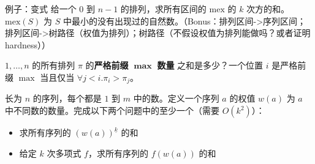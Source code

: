 \begin{frame}{例子：变式}
    给一个 $0$ 到 $n-1$ 的排列，求所有区间的 $\mathrm{mex}$ 的 $k$ 次方的和。$\mathrm{mex}(S)$ 为 $S$ 中最小的没有出现过的自然数。（Bonus：排列区间->序列区间；排列区间->树路径（权值为排列）；树路径（不假设权值为排列能做吗？或者证明 hardness））

    $1,\ldots,n$ 的所有排列 $\pi$ 的\textbf{严格前缀} $\mathbf{\max}$ \textbf{数量} 之和是多少？一个位置 $i$ 是严格前缀 $\max$ 当且仅当 $\forall j<i.\pi_i>\pi_j$。

    长为 $n$ 的序列，每个都是 $1$ 到 $m$ 中的数。定义一个序列 $a$ 的权值 $w(a)$ 为 $a$ 中不同数的数量。完成以下两个问题中的至少一个（需要 $O(k^2)$）：
    \begin{itemize}
        \item 求所有序列的 $(w(a))^{\underline{k}}$ 的和
        \item 给定 $k$ 次多项式 $f$，求所有序列的 $f(w(a))$ 的和
    \end{itemize}
\end{frame}

